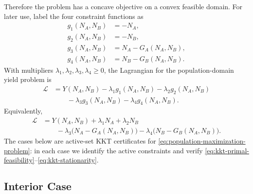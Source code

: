 \documentclass{article}
\numberwithin{equation}{section}
\begin{document}
Therefore the problem has a concave objective on a convex feasible domain.
For later use, label the four constraint functions as
\begin{equation}
    \label{eq:population-constraint-functions}
    \begin{aligned}
    g_1(N_A,N_B)&=-N_A,\\
    g_2(N_A,N_B)&=-N_B,\\
    g_3(N_A,N_B)&=N_A-G_A(N_A,N_B),\\
    g_4(N_A,N_B)&=N_B-G_B(N_A,N_B).
    \end{aligned}
\end{equation}
With multipliers $\lambda_1,\lambda_2,\lambda_3,\lambda_4\geq0$, the
Lagrangian for the population-domain yield problem is
\begin{equation}
    \label{eq:population-lagrangian}
    \begin{aligned}
    \mathcal L
    &=
    Y(N_A,N_B)
    -\lambda_1 g_1(N_A,N_B)
    -\lambda_2 g_2(N_A,N_B)\\
    &\qquad
    -\lambda_3 g_3(N_A,N_B)
    -\lambda_4 g_4(N_A,N_B).
    \end{aligned}
\end{equation}
Equivalently,
\begin{equation}
    \label{eq:population-lagrangian-expanded}
    \begin{aligned}
    \mathcal L
    &=
    Y(N_A,N_B)
    +\lambda_1N_A+\lambda_2N_B\\
    &\qquad
    -\lambda_3\bigl(N_A-G_A(N_A,N_B)\bigr)
    -\lambda_4\bigl(N_B-G_B(N_A,N_B)\bigr).
    \end{aligned}
\end{equation}
The cases below are active-set KKT certificates for
\eqref{eq:population-maximization-problem}: in each case we identify
the active constraints and verify
\eqref{eq:kkt-primal-feasibility}--\eqref{eq:kkt-stationarity}.

\subsection{Interior Case}
\end{document}
